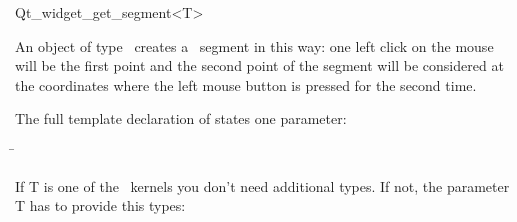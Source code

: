
\begin{ccRefClass}{Qt_widget_get_segment<T>}

\ccDefinition
An object of type \ccRefName\ creates a \cgal\ segment in this 
way: one left click on the mouse will be the first point and the second point 
of the segment will be considered at the coordinates where the left
mouse button is pressed for the second time.


\ccParameters

The full template declaration of  states one parameter:

\begin{tabbing}
 \=\\
\end{tabbing}

If T is one of the \cgal\ kernels you don't need additional types. If
not, the parameter T has to provide this types:

\ccTypes
{}

\ccInheritsFrom
{}

\ccGlue

\ccCreation
{}


\end{ccRefClass}








